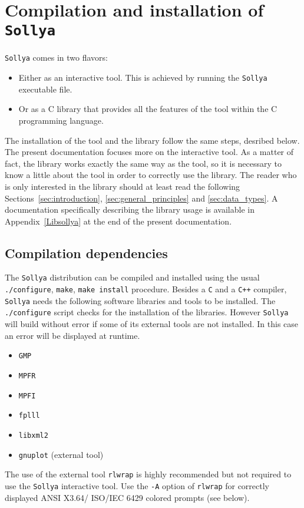 \documentclass[a4paper]{article}
\newcommand{\sollya}{\texttt{Sollya}\xspace}
\begin{document}
\tableofcontents

\section{Compilation and installation of \sollya}

\sollya comes in two flavors:
\begin{itemize}
\item Either as an interactive tool. This is achieved by running the \sollya executable file.
\item Or as a C library that provides all the features of the tool within the C programming language.
\end{itemize}

The installation of the tool and the library follow the same steps, desribed below. The present documentation focuses more on the interactive tool. As a matter of fact, the library works exactly the same way as the tool, so it is necessary to know a little about the tool in order to correctly use the library. The reader who is only interested in the library should at least read the following Sections~\ref{sec:introduction}, \ref{sec:general_principles} and \ref{sec:data_types}. A documentation specifically describing the library usage is available in Appendix~\ref{Libsollya} at the end of the present documentation.


\subsection{Compilation dependencies}

The \sollya distribution can be compiled and installed using the usual
\texttt{./configure}, \texttt{make}, \texttt{make install}
procedure. Besides a \texttt{C} and a \texttt{C++} compiler, \sollya needs the following
software libraries and tools to be installed. The \texttt{./configure}
script checks for the installation of the libraries. However \sollya
will build without error if some of its external tools are not
installed. In this case an error will be displayed at runtime.
\begin{itemize}
\item \texttt{GMP}
\item \texttt{MPFR}
\item \texttt{MPFI}
\item \texttt{fplll}
\item \texttt{libxml2}
\item \texttt{gnuplot} (external tool)
\end{itemize}
The use of the external tool \texttt{rlwrap} is highly recommended but
not required to use the \sollya interactive tool. Use the \texttt{-A}
option of \texttt{rlwrap} for correctly displayed ANSI X3.64/ ISO/IEC
6429 colored prompts (see below).
\end{document}
